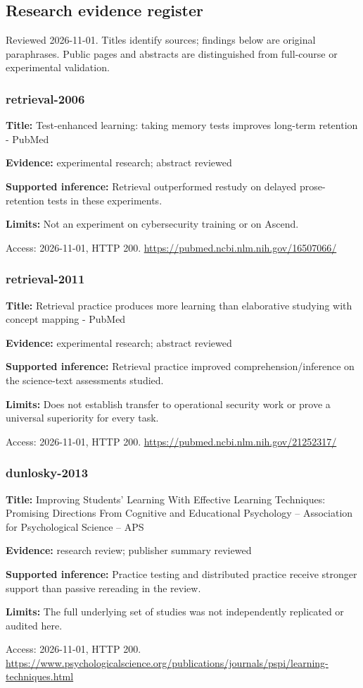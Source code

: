 \subsection{Research evidence register}
Reviewed 2026-11-01. Titles identify sources; findings below are original paraphrases. Public pages and abstracts are distinguished from full-course or experimental validation.
\subsubsection{retrieval-2006}
\noindent\textbf{Title:} Test-enhanced learning: taking memory tests improves long-term retention - PubMed\par
\noindent\textbf{Evidence:} experimental research; abstract reviewed\par
\noindent\textbf{Supported inference:} Retrieval outperformed restudy on delayed prose-retention tests in these experiments.\par
\noindent\textbf{Limits:} Not an experiment on cybersecurity training or on Ascend.\par
\noindent Access: 2026-11-01, HTTP 200. \url{https://pubmed.ncbi.nlm.nih.gov/16507066/}
\subsubsection{retrieval-2011}
\noindent\textbf{Title:} Retrieval practice produces more learning than elaborative studying with concept mapping - PubMed\par
\noindent\textbf{Evidence:} experimental research; abstract reviewed\par
\noindent\textbf{Supported inference:} Retrieval practice improved comprehension/inference on the science-text assessments studied.\par
\noindent\textbf{Limits:} Does not establish transfer to operational security work or prove a universal superiority for every task.\par
\noindent Access: 2026-11-01, HTTP 200. \url{https://pubmed.ncbi.nlm.nih.gov/21252317/}
\subsubsection{dunlosky-2013}
\noindent\textbf{Title:} Improving Students’ Learning With Effective Learning Techniques: Promising Directions From Cognitive and Educational Psychology – Association for Psychological Science – APS\par
\noindent\textbf{Evidence:} research review; publisher summary reviewed\par
\noindent\textbf{Supported inference:} Practice testing and distributed practice receive stronger support than passive rereading in the review.\par
\noindent\textbf{Limits:} The full underlying set of studies was not independently replicated or audited here.\par
\noindent Access: 2026-11-01, HTTP 200. \url{https://www.psychologicalscience.org/publications/journals/pspi/learning-techniques.html}
